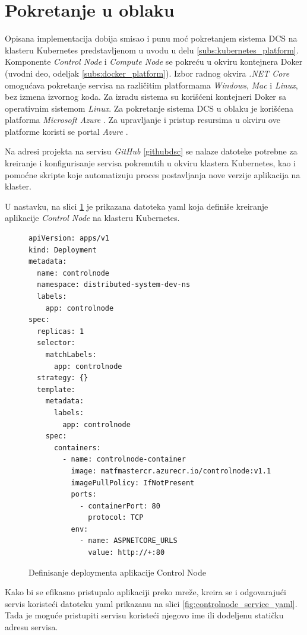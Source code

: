 \documentclass[12pt,oneside]{memoir}
\begin{document}
\section{Pokretanje u oblaku}

Opisana implementacija dobija smisao i punu moć pokretanjem sistema DCS na klasteru Kubernetes predstavljenom u uvodu u delu \ref{subs:kubernetes_platform}. Komponente \emph{Control Node} i \emph{Compute Node} se pokreću u okviru kontejnera Doker (uvodni deo, odeljak \ref{subs:docker_platform}). Izbor radnog okvira \emph{.NET Core} omogućava pokretanje servisa na različitim platformama \emph{Windows}, \emph{Mac} i \emph{Linux}, bez izmena izvornog koda. Za izradu sistema su korišćeni kontejneri Doker sa operativnim sistemom \emph{Linux}. Za pokretanje sistema DCS u oblaku je korišćena platforma \emph{Microsoft Azure} \cite{Azure}. Za upravljanje i pristup resursima u okviru ove platforme koristi se portal \emph{Azure} \cite{AzurePortal}.

Na adresi projekta na servisu \emph{GitHub} \ref{githubdsc} se nalaze datoteke potrebne za kreiranje i konfigurisanje servisa pokrenutih u okviru klastera Kubernetes, kao i pomoćne skripte koje automatizuju proces postavljanja nove verzije aplikacija na klaster.

U nastavku, na slici \ref{fig:controlnode_yaml} je prikazana datoteka yaml  koja definiše kreiranje aplikacije \emph{Control Node} na klasteru Kubernetes.

\begin{figure}[h!]
\centering
\begin{lstlisting}[style=yaml]
apiVersion: apps/v1
kind: Deployment
metadata:
  name: controlnode
  namespace: distributed-system-dev-ns
  labels:
    app: controlnode
spec:
  replicas: 1
  selector:
    matchLabels:
      app: controlnode
  strategy: {}
  template:
    metadata:
      labels:
        app: controlnode
    spec:
      containers:
        - name: controlnode-container
          image: matfmastercr.azurecr.io/controlnode:v1.1
          imagePullPolicy: IfNotPresent
          ports:
            - containerPort: 80
              protocol: TCP
          env:
            - name: ASPNETCORE_URLS
              value: http://+:80
\end{lstlisting}
\caption{Definisanje deploymenta aplikacije Control Node}
\label{fig:controlnode_yaml}
\end{figure}

Kako bi se efikasno pristupalo aplikaciji preko mreže, kreira se i odgovarajući servis koristeći datoteku yaml prikazanu na slici \ref{fig:controlnode_service_yaml}. Tada je moguće pristupiti servisu koristeći njegovo ime ili dodeljenu statičku adresu servisa.
\end{document}
